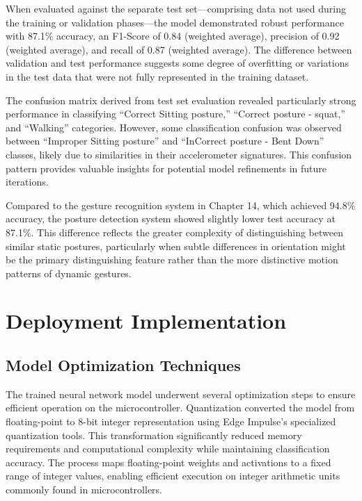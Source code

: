 \documentclass[
  9pt,
  letterpaper,
  abstract,
  titlepage]{scrbook}
\begin{document}
When evaluated against the separate test set---comprising data not used
during the training or validation phases---the model demonstrated robust
performance with 87.1\% accuracy, an F1-Score of 0.84 (weighted
average), precision of 0.92 (weighted average), and recall of 0.87
(weighted average). The difference between validation and test
performance suggests some degree of overfitting or variations in the
test data that were not fully represented in the training dataset.

The confusion matrix derived from test set evaluation revealed
particularly strong performance in classifying ``Correct Sitting
posture,'' ``Correct posture - squat,'' and ``Walking'' categories.
However, some classification confusion was observed between ``Improper
Sitting posture'' and ``InCorrect posture - Bent Down'' classes, likely
due to similarities in their accelerometer signatures. This confusion
pattern provides valuable insights for potential model refinements in
future iterations.

Compared to the gesture recognition system in Chapter 14, which achieved
94.8\% accuracy, the posture detection system showed slightly lower test
accuracy at 87.1\%. This difference reflects the greater complexity of
distinguishing between similar static postures, particularly when subtle
differences in orientation might be the primary distinguishing feature
rather than the more distinctive motion patterns of dynamic gestures.

\section{Deployment Implementation}\label{deployment-implementation}

\subsection{Model Optimization
Techniques}\label{model-optimization-techniques}

The trained neural network model underwent several optimization steps to
ensure efficient operation on the microcontroller. Quantization
converted the model from floating-point to 8-bit integer representation
using Edge Impulse's specialized quantization tools. This transformation
significantly reduced memory requirements and computational complexity
while maintaining classification accuracy. The process maps
floating-point weights and activations to a fixed range of integer
values, enabling efficient execution on integer arithmetic units
commonly found in microcontrollers.
\end{document}
